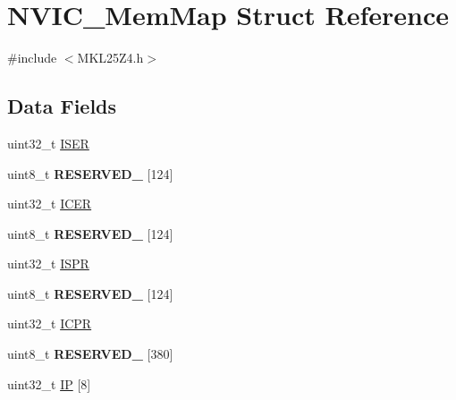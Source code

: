 \hypertarget{struct_n_v_i_c___mem_map}{}\section{N\+V\+I\+C\+\_\+\+Mem\+Map Struct Reference}
\label{struct_n_v_i_c___mem_map}


{\ttfamily \#include $<$M\+K\+L25\+Z4.\+h$>$}

\subsection*{Data Fields}
\begin{DoxyCompactItemize}
\item 
uint32\+\_\+t \hyperlink{struct_n_v_i_c___mem_map_aaa8fb79136e7f528c4644ca658d637e8}{I\+S\+ER}
\item 
\mbox{\label{struct_n_v_i_c___mem_map_a69ae64c8f8f5a0fb7acb96ef4918cba2}} 
uint8\+\_\+t {\bfseries R\+E\+S\+E\+R\+V\+E\+D\+\_} \mbox{[}124\mbox{]}
\item 
uint32\+\_\+t \hyperlink{struct_n_v_i_c___mem_map_a0def6b0bebb3e2e35a180f31f74baef8}{I\+C\+ER}
\item 
\mbox{\label{struct_n_v_i_c___mem_map_a334ef1820658212f8a0eac5e7a6f849c}} 
uint8\+\_\+t {\bfseries R\+E\+S\+E\+R\+V\+E\+D\+\_} \mbox{[}124\mbox{]}
\item 
uint32\+\_\+t \hyperlink{struct_n_v_i_c___mem_map_a91ab049ba145735fc8d9319f3b0f0cb4}{I\+S\+PR}
\item 
\mbox{\label{struct_n_v_i_c___mem_map_a0ee42a0628832413d90ff77b050481f7}} 
uint8\+\_\+t {\bfseries R\+E\+S\+E\+R\+V\+E\+D\+\_} \mbox{[}124\mbox{]}
\item 
uint32\+\_\+t \hyperlink{struct_n_v_i_c___mem_map_a47b16d0ffa924a50639a73c0494913b0}{I\+C\+PR}
\item 
\mbox{\label{struct_n_v_i_c___mem_map_ae5a29589e415fd83c840ca9b764be2d3}} 
uint8\+\_\+t {\bfseries R\+E\+S\+E\+R\+V\+E\+D\+\_} \mbox{[}380\mbox{]}
\item 
uint32\+\_\+t \hyperlink{struct_n_v_i_c___mem_map_a4dae41a548b9558e16c2280c8695a6f8}{IP} \mbox{[}8\mbox{]}
\end{DoxyCompactItemize}


